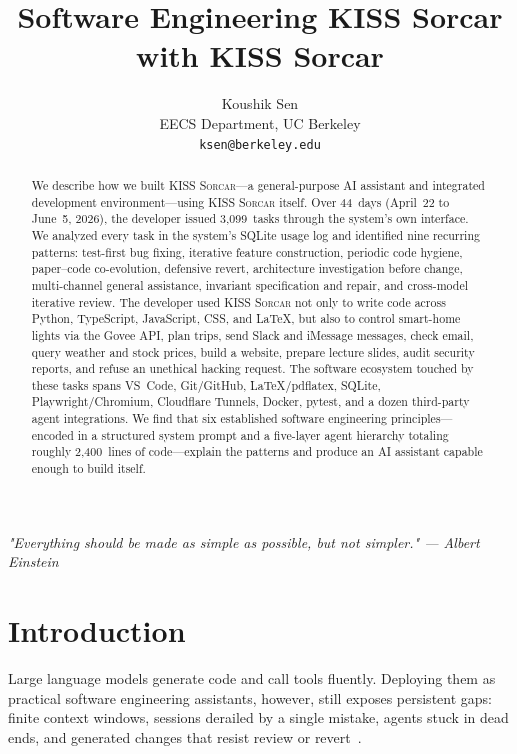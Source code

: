 \documentclass{article}
\title{Software Engineering KISS Sorcar with KISS Sorcar}
\author{%
Koushik Sen \\ EECS Department, UC Berkeley\\ \texttt{ksen@berkeley.edu} \\ }
\newcommand{\kisssys}{\textsc{KISS Sorcar}}
\begin{document}
\maketitle

\begin{center}
\textit{"Everything should be made as simple as possible, but not simpler." — Albert Einstein}
\end{center}

\begin{abstract}
We describe how we built \kisssys{}---a general-purpose AI assistant and
integrated development environment---using \kisssys{} itself.
Over 44~days (April~22 to June~5, 2026), the developer issued
3,099~tasks through the system's own interface.
We analyzed every task in the system's SQLite usage log
and identified nine recurring patterns: test-first bug fixing,
iterative feature construction, periodic code hygiene, paper--code
co-evolution, defensive revert, architecture investigation before
change, multi-channel general assistance, invariant specification
and repair, and cross-model iterative review.
The developer used \kisssys{} not only to write code across
Python, TypeScript, JavaScript, CSS, and \LaTeX{}, but also to
control smart-home lights via the Govee API, plan trips,
send Slack and iMessage messages, check email, query weather
and stock prices, build a website, prepare lecture slides,
audit security reports, and refuse an unethical hacking request.
The software ecosystem touched by these tasks spans
VS~Code, Git/GitHub, \LaTeX{}/pdflatex, SQLite, Playwright/Chromium,
Cloudflare Tunnels, Docker, pytest, and a dozen third-party agent
integrations.
We find that six established software engineering principles---encoded
in a structured system prompt and a five-layer agent
hierarchy totaling roughly 2,400~lines of code---explain the patterns
and produce an AI assistant capable enough to build itself.
\end{abstract}

\section{Introduction}
\label{sec:intro}

Large language models generate code and call tools fluently.
Deploying them as practical software engineering assistants, however,
still exposes persistent gaps: finite context windows, sessions
derailed by a single mistake, agents stuck in dead ends, and
generated changes that resist review or revert~\cite{yang2024sweagent,
wang2024openhands}.
\end{document}
